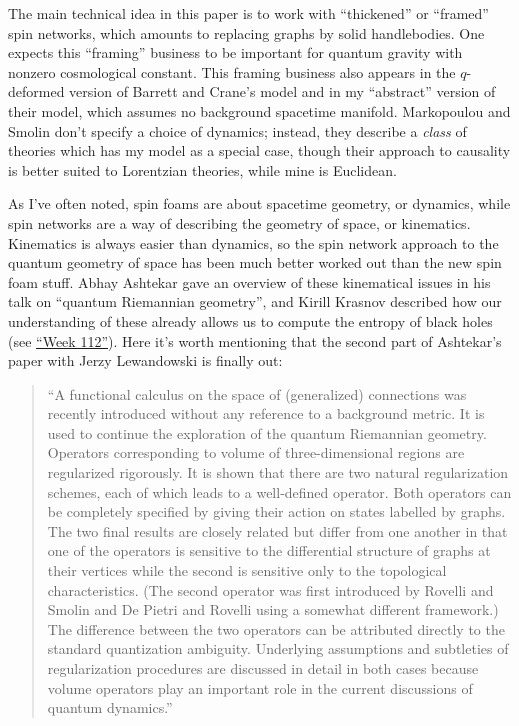\documentclass{article}
\def\tightlist{}
\renewcommand{\texttt}[1]{%
  \begingroup
  \ttfamily
  \begingroup\lccode`~=`/\lowercase{\endgroup\def~}{/\discretionary{}{}{}}%
  \begingroup\lccode`~=`[\lowercase{\endgroup\def~}{[\discretionary{}{}{}}%
  \begingroup\lccode`~=`.\lowercase{\endgroup\def~}{.\discretionary{}{}{}}%
  \catcode`/=\active\catcode`[=\active\catcode`.=\active
  \scantokens{#1\noexpand}%
  \endgroup
}
\begin{document}
The main technical idea in this paper is to work with ``thickened'' or
``framed'' spin networks, which amounts to replacing graphs by solid
handlebodies. One expects this ``framing'' business to be important for
quantum gravity with nonzero cosmological constant. This framing
business also appears in the \(q\)-deformed version of Barrett and
Crane's model and in my ``abstract'' version of their model, which
assumes no background spacetime manifold. Markopoulou and Smolin don't
specify a choice of dynamics; instead, they describe a \emph{class} of
theories which has my model as a special case, though their approach to
causality is better suited to Lorentzian theories, while mine is
Euclidean.

As I've often noted, spin foams are about spacetime geometry, or
dynamics, while spin networks are a way of describing the geometry of
space, or kinematics. Kinematics is always easier than dynamics, so the
spin network approach to the quantum geometry of space has been much
better worked out than the new spin foam stuff. Abhay Ashtekar gave an
overview of these kinematical issues in his talk on ``quantum Riemannian
geometry'', and Kirill Krasnov described how our understanding of these
already allows us to compute the entropy of black holes (see
\protect\hyperlink{week112}{``Week 112''}). Here it's worth mentioning
that the second part of Ashtekar's paper with Jerzy Lewandowski is
finally out:


\begin{quote}
``A functional calculus on the space of (generalized) connections was
recently introduced without any reference to a background metric. It is
used to continue the exploration of the quantum Riemannian geometry.
Operators corresponding to volume of three-dimensional regions are
regularized rigorously. It is shown that there are two natural
regularization schemes, each of which leads to a well-defined operator.
Both operators can be completely specified by giving their action on
states labelled by graphs. The two final results are closely related but
differ from one another in that one of the operators is sensitive to the
differential structure of graphs at their vertices while the second is
sensitive only to the topological characteristics. (The second operator
was first introduced by Rovelli and Smolin and De Pietri and Rovelli
using a somewhat different framework.) The difference between the two
operators can be attributed directly to the standard quantization
ambiguity. Underlying assumptions and subtleties of regularization
procedures are discussed in detail in both cases because volume
operators play an important role in the current discussions of quantum
dynamics.''
\end{quote}
\end{document}
